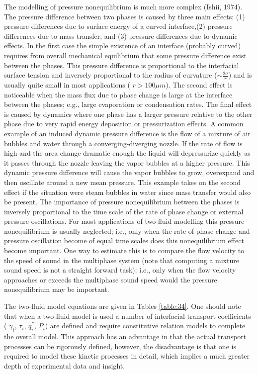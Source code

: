 The modelling of pressure nonequilibrium is much more complex (Ishii, 1974).
The pressure difference between two phases is caused by three main effects: (1) pressure differences due to surface energy of a curved interface,(2) pressure differences due to mass transfer, and (3) pressure differences due to dynamic effects.
In the first case the simple existence of an interface (probably curved) requires from overall mechanical equilibrium that some pressure difference exist between the phases.
This pressure difference is proportional to the interfacial surface tension and inversely proportional to the radius of curvature ($\sim \frac{2\sigma}{r}$) and is usually quite small in most applications ( $ r > 100 \mu m$).
The second effect is noticeable when the mass flux due to phase change is large at the interface between the phases; e.g., large evaporation or condensation rates.
The final effect is caused by dynamics where one phase has a larger pressure relative to the other phase due to very rapid energy deposition or pressurization effects.
A common example of an induced dynamic pressure difference is the flow of a mixture of air bubbles and water through a converging-diverging nozzle.
If the rate of flow is high and the area change dramatic enough the liquid will depressurize quickly as it passes through the nozzle leaving the vapor bubbles at a higher pressure.
This dynamic pressure difference will cause the vapor bubbles to grow, overexpand and then oscillate around a new mean pressure.
This example takes on the second effect if the situation were steam bubbles in water since mass transfer would also be present.
The importance of pressure nonequilibrium between the phases is inversely proportional to the time scale of the rate of phase change or external pressure oscillations.
For most applications of two-fluid modelling this pressure nonequilibrium is usually neglected; i.e., only when the rate of phase change and pressure oscillation become of equal time scales does this nonequilibrium effect become important.
One way to estimate this is to compare the flow velocity to the speed of sound in the multiphase system (note that computing a mixture sound speed is not a straight forward task): i.e., only when the flow velocity approaches or exceeds the multiphase sound speed would the pressure nonequilibrium may be important.

The two-fluid model equations are given in Tables \ref{table:34}.
One should note that when a two-fluid model is used a number of interfacial transport coefficients ( $\gamma_i$, $\tau_i$, $q^{''}_i$, $P_i$) are defined and require constitutive relation models to complete the overall model.
This approach has an advantage in that the actual transport processes can be rigorously defined, however, the disadvantage is that one is required to model these kinetic processes in detail, which implies a much greater depth of experimental data and insight.

